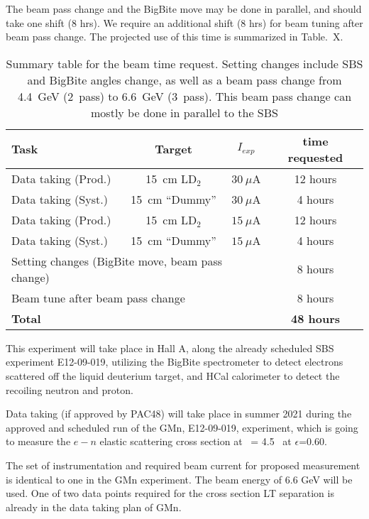 %
The beam pass change and the BigBite move may be done in parallel, and should take one shift (8 hrs). We require an additional shift (8 hrs) for beam tuning after beam pass change. 
The projected use of this time is summarized in Table.~X.%
%
\begin{table}[h]
\centering
\begin{tabular}{|l|c|c|c|}
\hline
Task & Target & $I_{exp}$ & time requested \\
\hline
Data taking (Prod.) & 15~cm LD$_2$ & $30~\mu$A & 12 hours \\ 
\hline
Data taking (Syst.) & 15~cm ``Dummy'' & $30~\mu$A & 4 hours \\ 
\hline
Data taking (Prod.) & 15~cm LD$_2$ & $15~\mu$A & 12 hours \\ 
\hline
Data taking (Syst.) & 15~cm ``Dummy'' & $15~\mu$A & 4 hours \\ 
\hline
\multicolumn{3}{|l|}{Setting changes (BigBite move, beam pass change)} & 8 hours \\
\multicolumn{3}{|l|}{Beam tune after beam pass change} & 8 hours \\
\hline
\hline
\multicolumn{3}{|l|}{\bf Total} & {\bf 48 hours} \\ 
\hline
\end{tabular} 
\caption{Summary table for the beam time request. Setting changes include SBS and BigBite angles change, as well as a beam pass change from 4.4~GeV (2~pass) to 6.6~GeV (3~pass). This beam pass change can mostly be done in parallel to the SBS}
\label{tab:beamtime}
\end{table}

This experiment will take place in Hall A, along the already scheduled SBS \gmn experiment E12-09-019, utilizing the BigBite spectrometer to detect electrons scattered off 
the liquid deuterium target, and HCal calorimeter to detect the recoiling neutron and proton.

Data taking (if approved by PAC48) will take place in summer 2021 during the approved and scheduled run of the GMn, E12-09-019, experiment,
which is going to measure the $e-n$ elastic scattering cross section at \qsq~= 4.5 \gevcsq~at $\epsilon$=0.60.

The set of instrumentation and required beam current for proposed measurement is identical to one in the GMn experiment.
The beam energy of 6.6 GeV will be used.
One of two data points required for the cross section LT separation is already in the data taking plan of GMn.

